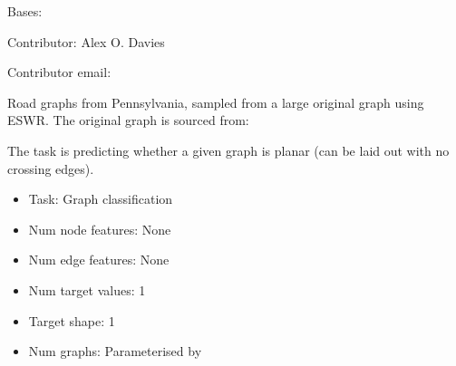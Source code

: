 \documentclass[letterpaper,10pt,english]{sphinxhowto}
\begin{document}
\begin{fulllineitems}
\label{\detokenize{datasets/real:datasets.real.RoadDataset}}
\pysigstartsignatures
{}
\pysigstopsignatures
\sphinxAtStartPar
Bases: 

\sphinxAtStartPar
Contributor: Alex O. Davies

\sphinxAtStartPar
Contributor email: 

\sphinxAtStartPar
Road graphs from Pennsylvania, sampled from a large original graph using ESWR.
The original graph is sourced from:
\begin{quote}

\sphinxAtStartPar
{}
\end{quote}

\sphinxAtStartPar
The task is predicting whether a given graph is planar (can be laid out with no crossing edges).
\begin{itemize}
\item {} 
\sphinxAtStartPar
Task: Graph classification

\item {} 
\sphinxAtStartPar
Num node features: None

\item {} 
\sphinxAtStartPar
Num edge features: None

\item {} 
\sphinxAtStartPar
Num target values: 1

\item {} 
\sphinxAtStartPar
Target shape: 1

\item {} 
\sphinxAtStartPar
Num graphs: Parameterised by 


\end{itemize}
\end{fulllineitems}
\end{document}
